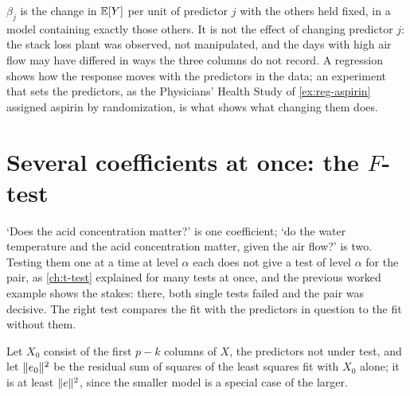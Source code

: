 \begin{pitfall}
$\beta_j$ is the change in $\operatorname*{\mathbb{E}}[Y]$ per unit of predictor $j$ with the others held fixed, in a model containing exactly those others. It is not the effect of changing predictor $j$: the stack loss plant was observed, not manipulated, and the days with high air flow may have differed in ways the three columns do not record. A regression shows how the response moves with the predictors in the data; an experiment that sets the predictors, as the Physicians' Health Study of \cref{ex:reg-aspirin} assigned aspirin by randomization, is what shows what changing them does.
\end{pitfall}

\section{Several coefficients at once: the \texorpdfstring{$F$}{F}-test}
\label{sec:mreg-ftest}

`Does the acid concentration matter?' is one coefficient; `do the water temperature and the acid concentration matter, given the air flow?' is two.
Testing them one at a time at level $\alpha$ each does not give a test of level $\alpha$ for the pair, as \cref{ch:t-test} explained for many tests at once, and the previous worked example shows the stakes: there, both single tests failed and the pair was decisive.
The right test compares the fit with the predictors in question to the fit without them.

Let $X_0$ consist of the first $p - k$ columns of $X$, the predictors not under test, and let $\lVert e_0\rVert^2$ be the residual sum of squares of the least squares fit with $X_0$ alone; it is at least $\lVert e\rVert^2$, since the smaller model is a special case of the larger.

